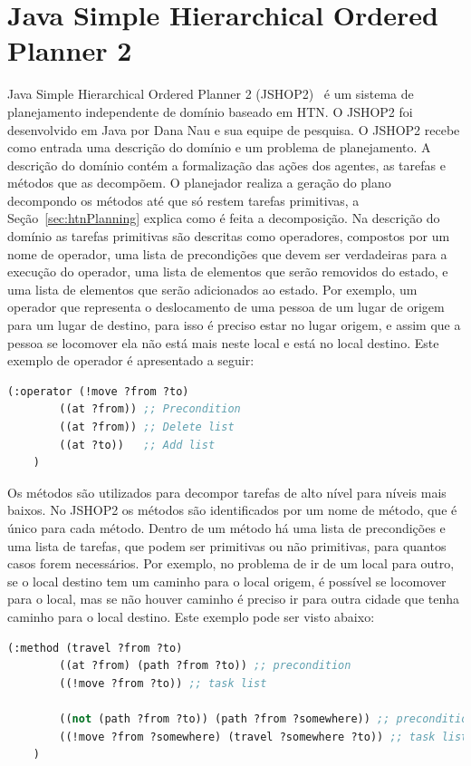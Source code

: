 \section{Java Simple Hierarchical Ordered Planner 2}\label{sec:jshop}
		
Java Simple Hierarchical Ordered Planner 2 (JSHOP2)~\cite{nauJSHOP2} é um sistema de planejamento independente de domínio baseado em HTN. 
O JSHOP2 foi desenvolvido em Java por Dana Nau e sua equipe de pesquisa.  
O JSHOP2 recebe como entrada uma descrição do domínio e um problema de planejamento.
A descrição do domínio contém a formalização das ações dos agentes, as tarefas e métodos que as decompõem.
O planejador realiza a geração do plano decompondo os métodos até que só restem tarefas primitivas, a Seção~\ref{sec:htnPlanning} explica como é feita a decomposição. 
Na descrição do domínio as tarefas primitivas são descritas como operadores, compostos por um nome de operador, uma lista de precondições que devem ser verdadeiras para a execução do operador, uma lista de elementos que serão removidos do estado, e uma lista de elementos que serão adicionados ao estado. 
Por exemplo, um operador que representa o deslocamento de uma pessoa de um lugar de origem para um lugar de destino, para isso é preciso estar no lugar origem, e assim que a pessoa se locomover ela não está mais neste local e está no local destino. Este exemplo de operador é apresentado a seguir:

\lstset{style=codeStyle}
\begin{lstlisting}[language=lisp]
	(:operator (!move ?from ?to) 
		((at ?from)) ;; Precondition
		((at ?from)) ;; Delete list
		((at ?to))   ;; Add list
	)
\end{lstlisting}

Os métodos são utilizados para decompor tarefas de alto nível para níveis mais baixos. 
No JSHOP2 os métodos são identificados por um nome de método, que é único para cada método. 
Dentro de um método há uma lista de precondições e uma lista de tarefas, que podem ser primitivas ou não primitivas, para quantos casos forem necessários. 
Por exemplo, no problema de ir de um local para outro, se o local destino tem um caminho para o local origem, é possível se locomover para o local, mas se não houver caminho é preciso ir para outra cidade que tenha caminho para o local destino. 
Este exemplo pode ser visto abaixo:

\lstset{style=codeStyle}
\begin{lstlisting}[language=lisp]
	(:method (travel ?from ?to)
		((at ?from) (path ?from ?to)) ;; precondition 
		((!move ?from ?to)) ;; task list
		
		((not (path ?from ?to)) (path ?from ?somewhere)) ;; precondition 
		((!move ?from ?somewhere) (travel ?somewhere ?to)) ;; task list
	)
\end{lstlisting}

